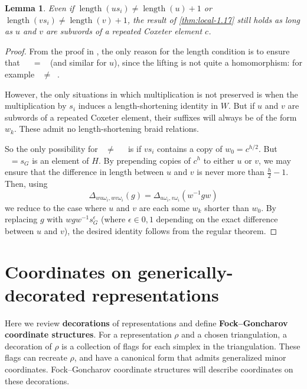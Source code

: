\documentclass{amsart}
\theoremstyle{plain}
\newtheorem{lemma}[theorem]{Lemma}
\theoremstyle{definition}
\theoremstyle{remark}
\newcommand{\defined}[1]{\textbf{#1}}
\newcommand{\fundamentalweight}{\omega}
\newcommand{\genminoryz}[3]{\Delta_{{#1} \fundamentalweight_{#3}, {#2}%
    \fundamentalweight_{#3}}}
\newcommand{\lifttoG}[1]{{\mathop{\overline{#1}}}}
\DeclareMathOperator{\length}{length}
\begin{document}
  \begin{lemma}
    \label{lem:thm-1.17-for-repeated-c}
    Even if $\length(u s_i) \ne \length(u) + 1$ or $\length(v s_i) \ne
    \length(v) + 1$, the result of \cref{thm:local-1.17} still holds as
    long as $u$ and $v$ are subwords of a repeated Coxeter element $c$.
  \end{lemma}
  \begin{proof}
    From the proof in \cite{fominzelevinsky1999}, the only reason for
    the length condition is to ensure that $\lifttoG{v} \lifttoG{s_i} =
    \lifttoG{vs_i}$ (and similar for $u$), since the lifting is not
    quite a homomorphism: for example $\lifttoG{s_i s_i} \ne
    \lifttoG{e}$.

    However, the only situations in which multiplication is not
    preserved is when the multiplication by $s_i$ induces a
    length-shortening identity in $W$. But if $u$ and $v$ are subwords
    of a repeated Coxeter element, their suffixes will always be of the
    form $w_k$. These admit no length-shortening braid relations.

    So the only possibility for $\lifttoG{v s_i} \ne \lifttoG{v}
    \lifttoG{s_i}$ is if $v s_i$ contains a copy of $w_0 = c^{h/2}$. But
    $\lifttoG{c^{h}} = s_G$ is an element of $H$. By prepending copies
    of $c^h$ to either $u$ or $v$, we may ensure that the difference in
    length between $u$ and $v$ is never more than $\frac{h}{2} - 1$.
    Then, using \[ \genminoryz{w u}{w v}{i}(g) =
      \genminoryz{u}{v}{i}(w^{-1} g w) \] we reduce to the case where
    $u$ and $v$ are each some $w_k$ shorter than $w_0$. By replacing $g$
    with $w g w^{-1} s_G^{\epsilon}$ (where $\epsilon \in {0,1}$
    depending on the exact difference between $u$ and $v$), the desired
    identity follows from the regular theorem.
  \end{proof}

  \section{Coordinates on generically-decorated representations}

  \label{sec:reps-from-conf3star}

  Here we review \defined{decorations} of representations and define
  \defined{Fock--Goncharov coordinate structures}. For a representation
  $\rho$ and a chosen triangulation, a decoration of $\rho$ is a
  collection of flags for each simplex in the triangulation. These flags
  can recreate $\rho$, and have a canonical form that admits generalized
  minor coordinates. Fock--Goncharov coordinate structures will describe
  coordinates on these decorations.
\end{document}
